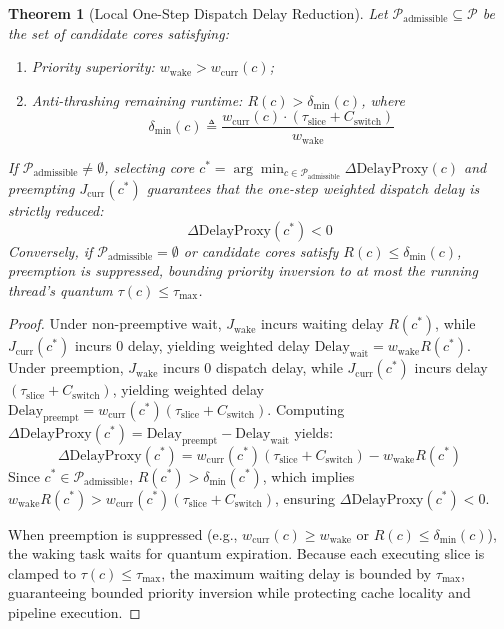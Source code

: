 \documentclass[conference]{IEEEtran}
\newtheorem{theorem}{Theorem}
\begin{document}
\begin{theorem}[Local One-Step Dispatch Delay Reduction]
\label{thm:oapf}
Let $\mathcal{P}_{\mathrm{admissible}} \subseteq \mathcal{P}$ be the set of candidate cores satisfying:
\begin{enumerate}
    \item Priority superiority: $w_{\mathrm{wake}} > w_{\mathrm{curr}}(c)$;
    \item Anti-thrashing remaining runtime: $R(c) > \delta_{\min}(c)$, where
    \begin{equation}
    \delta_{\min}(c) \triangleq \frac{w_{\mathrm{curr}}(c) \cdot (\tau_{\mathrm{slice}} + C_{\mathrm{switch}})}{w_{\mathrm{wake}}}
    \end{equation}
\end{enumerate}
If $\mathcal{P}_{\mathrm{admissible}} \ne \emptyset$, selecting core $c^* = \arg\min_{c \in \mathcal{P}_{\mathrm{admissible}}} \Delta\mathrm{DelayProxy}(c)$ and preempting $J_{\mathrm{curr}}(c^*)$ guarantees that the one-step weighted dispatch delay is strictly reduced:
\begin{equation}
\Delta\mathrm{DelayProxy}(c^*) < 0
\end{equation}
Conversely, if $\mathcal{P}_{\mathrm{admissible}} = \emptyset$ or candidate cores satisfy $R(c) \le \delta_{\min}(c)$, preemption is suppressed, bounding priority inversion to at most the running thread's quantum $\tau(c) \le \tau_{\max}$.
\end{theorem}

\begin{proof}
Under non-preemptive wait, $J_{\mathrm{wake}}$ incurs waiting delay $R(c^*)$, while $J_{\mathrm{curr}}(c^*)$ incurs 0 delay, yielding weighted delay $\mathrm{Delay}_{\mathrm{wait}} = w_{\mathrm{wake}} R(c^*)$. Under preemption, $J_{\mathrm{wake}}$ incurs 0 dispatch delay, while $J_{\mathrm{curr}}(c^*)$ incurs delay $(\tau_{\mathrm{slice}} + C_{\mathrm{switch}})$, yielding weighted delay $\mathrm{Delay}_{\mathrm{preempt}} = w_{\mathrm{curr}}(c^*) (\tau_{\mathrm{slice}} + C_{\mathrm{switch}})$. Computing $\Delta\mathrm{DelayProxy}(c^*) = \mathrm{Delay}_{\mathrm{preempt}} - \mathrm{Delay}_{\mathrm{wait}}$ yields:
\begin{equation}
\Delta\mathrm{DelayProxy}(c^*) = w_{\mathrm{curr}}(c^*)(\tau_{\mathrm{slice}} + C_{\mathrm{switch}}) - w_{\mathrm{wake}} R(c^*)
\end{equation}
Since $c^* \in \mathcal{P}_{\mathrm{admissible}}$, $R(c^*) > \delta_{\min}(c^*)$, which implies $w_{\mathrm{wake}} R(c^*) > w_{\mathrm{curr}}(c^*) (\tau_{\mathrm{slice}} + C_{\mathrm{switch}})$, ensuring $\Delta\mathrm{DelayProxy}(c^*) < 0$. 

When preemption is suppressed (e.g., $w_{\mathrm{curr}}(c) \ge w_{\mathrm{wake}}$ or $R(c) \le \delta_{\min}(c)$), the waking task waits for quantum expiration. Because each executing slice is clamped to $\tau(c) \le \tau_{\max}$, the maximum waiting delay is bounded by $\tau_{\max}$, guaranteeing bounded priority inversion while protecting cache locality and pipeline execution.
\end{proof}
\end{document}
